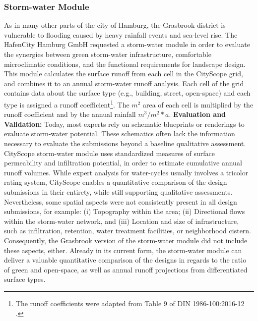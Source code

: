 {{        \subsubsection{Storm-water Module}
        {
            As in many other parts of the city of Hamburg, the Grasbrook district is vulnerable to flooding caused by heavy rainfall events and sea-level rise. The HafenCity Hamburg GmbH requested a storm-water module in order to evaluate the synergies between green storm-water infrastructure, comfortable microclimatic conditions, and the functional requirements for landscape design. This module calculates the surface runoff from each cell in the CityScope grid, and combines it to an annual storm-water runoff analysis. Each cell of the grid contains data about the surface type (e.g., building, street, open-space) and each type is assigned a runoff coefficient\footnote{The runoff coefficients were adapted from Table 9 of DIN 1986-100:2016-12 \cite{e16}.}. The $m^2$ area of each cell is multiplied by the runoff coefficient and by the annual rainfall $m^3/m^2*a$.
            \newline
            \textbf{Evaluation and Validation:} Today, most experts rely on schematic blueprints or renderings to evaluate storm-water potential. These schematics often lack the information necessary to evaluate the submissions beyond a baseline qualitative assessment. CityScope storm-water module uses standardized measures of surface permeability and infiltration potential, in order to estimate cumulative annual runoff volumes. While expert analysis for water-cycles usually involves a tricolor rating system, CityScope enables a quantitative comparison of the design submissions in their entirety, while still supporting qualitative assessments.
            \newline
            Nevertheless, some spatial aspects were not consistently present in all design submissions, for example: (i) Topography within the area; (ii) Directional flows within the storm-water network, and (iii) Location and size of infrastructure, such as infiltration, retention, water treatment facilities, or neighborhood cistern. Consequently, the Grasbrook version of the storm-water module did not include these aspects, either. Already in its current form, the storm-water module can deliver a valuable quantitative comparison of the designs in regards to the ratio of green and open-space, as well as annual runoff projections from differentiated surface types.
        }

}}
